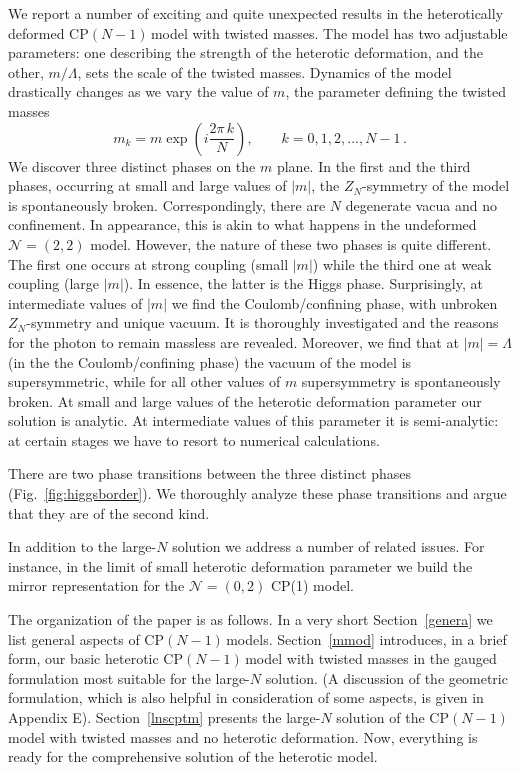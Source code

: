 \documentclass[epsfig,12pt]{article}
\newcommand{\cpn}{CP$(N-1)\,$}
\newcommand{\zn}{$Z_N$}
\newcommand{\ntwot}{${\mathcal N}= \left(2,2\right) $ }
\newcommand{\ntwoo}{${\mathcal N}= \left(0,2\right) $ }
\begin{document}
We report a number of exciting and quite unexpected results in the heterotically deformed \cpn model
with twisted masses. The model has two adjustable parameters:
one describing the strength of the heterotic deformation, and the other, $m/\Lambda$,
sets the scale of the twisted masses. 
Dynamics of the model drastically changes as we vary the value of $m$, the parameter
defining the 
 twisted masses
$$
m_k = m \exp\left(i\frac{2\pi \,k}{N}
\right),\qquad k=0,1,2,..., N-1\,.
$$
We discover three distinct phases on the $m$ plane. In the first and the third phases,
occurring at small and large values of $|m|$, the
\zn-symmetry of the model is spontaneously broken. Correspondingly,
there are $N$ degenerate vacua and no confinement. In appearance, this is akin 
to what happens in the undeformed \ntwot model. 
However, the nature of these two phases is quite different. The first one occurs
at strong  coupling (small $|m|$) while the third one at weak coupling
(large $|m|$). In essence, the latter is the Higgs phase.
Surprisingly, at intermediate values of $|m|$ we find the Coulomb/confining phase, with unbroken
\zn-symmetry and unique vacuum. It is thoroughly investigated
and the reasons for the photon to remain massless are revealed. Moreover, we find that at $|m|=\Lambda$
(in the  the Coulomb/confining phase) the vacuum of the model is supersymmetric, while
for all other values of $m$ supersymmetry is spontaneously broken.
At small and large values of the heterotic deformation parameter our solution is analytic.
At intermediate values of this parameter it is semi-analytic:
at certain stages we have to resort to numerical calculations. 

There are two phase transitions between the three distinct phases (Fig.~\ref{fig:higgsborder}). We
thoroughly analyze these phase transitions and argue that they are of the second kind.

In addition to the large-$N$ solution we address a number of related issues. For instance, in the limit
of  small
heterotic deformation parameter we build the mirror representation for the \ntwoo CP(1) model.

The organization of the paper is as follows. In a very short Section~\ref{genera} we list 
general aspects of \cpn models.  
Section~\ref{mmod} introduces, in a brief form,
our basic heterotic \cpn model with twisted masses in the gauged formulation
most suitable for the large-$N$ solution. (A discussion of the geometric formulation,
which is also helpful in consideration of some aspects, is given in Appendix E).
Section~\ref{lnscptm} presents the large-$N$ solution of the \cpn model with twisted
masses and no heterotic deformation. Now, everything is ready for the comprehensive solution of the heterotic model.
\end{document}
